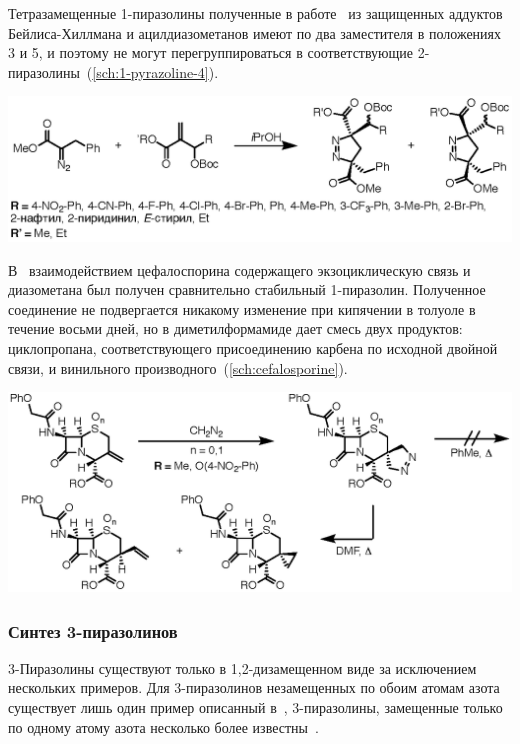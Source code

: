 Тетразамещенные 1-пиразолины полученные в работе~\cite{Sun2013} из защищенных аддуктов Бейлиса-Хиллмана и ацилдиазометанов имеют по два заместителя в положениях 3 и 5, и поэтому не могут перегруппироваться в соответствующие 2-пиразолины~(\ref{sch:1-pyrazoline-4}).

\begin{scheme}[h!]
    \centering
    \includegraphics{sections/literature/img/1-pyrazoline-4.eps}
    \caption{}
    \label{sch:1-pyrazoline-4}
\end{scheme}


В~\cite{Baldwin1990} взаимодействием цефалоспорина содержащего экзоциклическую связь и диазометана был получен сравнительно стабильный 1-пиразолин.
Полученное соединение не подвергается никакому изменение при кипячении в толуоле в течение восьми дней, но в диметилформамиде дает смесь двух продуктов: циклопропана, соответствующего присоединению карбена по исходной двойной связи, и винильного производного~(\ref{sch:cefalosporine}).

\begin{scheme}
    \centering
    \includegraphics{sections/literature/img/cefalosporine.eps}
    \caption{}
    \label{sch:cefalosporine}
\end{scheme}
\FloatBarrier


\subsubsection{Синтез 3-пиразолинов}
3-Пиразолины существуют только в 1,2-дизамещенном виде за исключением нескольких примеров.
Для 3-пиразолинов незамещенных по обоим атомам азота существует лишь один пример описанный в~\cite{Misani1956}, 3-пиразолины, замещенные только по одному атому азота несколько более известны~\cite{Takamizawa1963, Takamizawa1965, Armstrong1973, Burger1979}.


